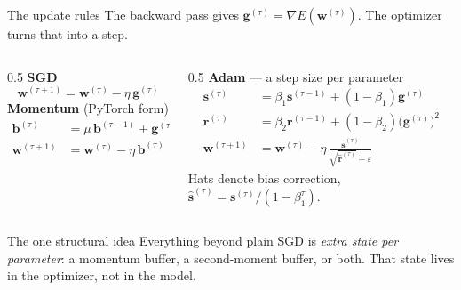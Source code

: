 \documentclass[10pt,aspectratio=169]{beamer}
\begin{document}
\begin{frame}{The update rules}
The backward pass gives $\mathbf{g}^{(\tau)} = \nabla E(\mathbf{w}^{(\tau)})$. The optimizer turns that into a step.
\vspace{0.2cm}
\begin{columns}[T]
\begin{column}{0.5\textwidth}
\textbf{SGD}
\[ \mathbf{w}^{(\tau+1)} = \mathbf{w}^{(\tau)} - \eta\, \mathbf{g}^{(\tau)} \]
\vspace{0.1cm}
\textbf{Momentum} (PyTorch form)
\begin{align*}
\mathbf{b}^{(\tau)} &= \mu\, \mathbf{b}^{(\tau-1)} + \mathbf{g}^{(\tau)}\\
\mathbf{w}^{(\tau+1)} &= \mathbf{w}^{(\tau)} - \eta\, \mathbf{b}^{(\tau)}
\end{align*}
\end{column}
\begin{column}{0.5\textwidth}
\textbf{Adam} --- a step size per parameter
\begin{align*}
\mathbf{s}^{(\tau)} &= \beta_1 \mathbf{s}^{(\tau-1)} + (1-\beta_1)\mathbf{g}^{(\tau)}\\
\mathbf{r}^{(\tau)} &= \beta_2 \mathbf{r}^{(\tau-1)} + (1-\beta_2)\big(\mathbf{g}^{(\tau)}\big)^2\\
\mathbf{w}^{(\tau+1)} &= \mathbf{w}^{(\tau)} - \eta\,
   \frac{\hat{\mathbf{s}}^{(\tau)}}{\sqrt{\hat{\mathbf{r}}^{(\tau)}}+\varepsilon}
\end{align*}
{\small Hats denote bias correction, $\hat{\mathbf{s}}^{(\tau)} = \mathbf{s}^{(\tau)}/(1-\beta_1^{\tau})$.}
\end{column}
\end{columns}
\vspace{0.25cm}
\begin{block}{The one structural idea}
Everything beyond plain SGD is \emph{extra state per parameter}: a momentum buffer, a
second-moment buffer, or both. That state lives in the optimizer, not in the model.
\end{block}
\end{frame}
\end{document}
